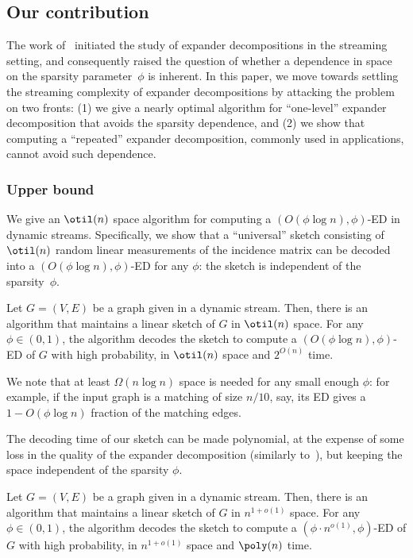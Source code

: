 \subsection{Our contribution}
The work of~\cite{streamexpdec} initiated the study of expander decompositions in the streaming setting, and consequently raised the question of whether a dependence in space on the sparsity parameter~$\phi$ is inherent. In this paper, we move towards settling the streaming complexity of expander decompositions by attacking the problem on two fronts: (1) we give a nearly optimal algorithm for ``one-level'' expander decomposition that avoids the sparsity dependence, and (2) we show that computing a ``repeated'' expander decomposition, commonly used in applications, cannot avoid such dependence.
\subsubsection*{Upper bound}
We give an $\otil(n)$ space algorithm for computing a $(O(\phi \log n), \phi)$-ED in dynamic streams. Specifically, we show that a ``universal'' sketch consisting of $\otil(n)$ random linear measurements of the incidence matrix can be decoded into a $(O(\phi \log n), \phi)$-ED for any $\phi$: the sketch is independent of the sparsity~$\phi$.

\begin{mainthsimple}
	\label{cor:main}
	Let $G=(V,E)$ be a graph given in a dynamic stream. Then, there is an algorithm that maintains a linear sketch of $G$ in $\otil(n)$ space. For any $\phi \in (0,1)$, the algorithm decodes the sketch to compute a $(O(\phi \log n), \phi)$-ED of $G$ with high probability, in $\otil(n)$ space and $2^{O(n)}$ time.
\end{mainthsimple}

\noindent
We note that at least $\Omega(n\log n)$ space is needed for any small enough $\phi$: for example, if the input graph is a matching of size $n/10$, say, its ED gives a $1-O(\phi \log n)$ fraction of the matching edges. 

The decoding time of our sketch can be made polynomial, at the expense of some loss in the quality of the expander decomposition (similarly to~\cite{streamexpdec}), but keeping the space independent of the sparsity $\phi$.

\begin{mainthsimple}
	\label{cor:mainpoly}
	Let $G=(V,E)$ be a graph given in a dynamic stream. Then, there is an algorithm that maintains a linear sketch of $G$ in $n^{1+o(1)}$ space. For any $\phi \in (0,1)$, the algorithm decodes the sketch to compute a $(\phi \cdot n^{o(1)}, \phi)$-ED of $G$ with high probability, in $n^{1+o(1)}$ space and $\poly(n)$ time.
\end{mainthsimple}


